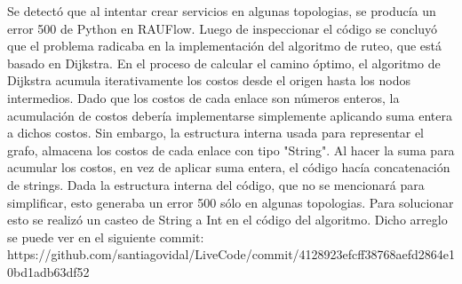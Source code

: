 Se detectó que al intentar crear servicios en algunas topologias, se producía un error 500 de Python en RAUFlow. Luego de inspeccionar el código se concluyó que el problema radicaba en la implementación del algoritmo de ruteo, que está basado en Dijkstra. En el proceso de calcular el camino óptimo, el algoritmo de Dijkstra acumula iterativamente los costos desde el origen hasta los nodos intermedios. Dado que los costos de cada enlace son números enteros, la acumulación de costos debería implementarse simplemente aplicando suma entera a dichos costos. Sin embargo, la estructura interna usada para representar el grafo, almacena los costos de cada enlace con tipo "String". Al hacer la suma para acumular los costos, en vez de aplicar suma entera, el código hacía concatenación de strings. Dada la estructura interna del código, que no se mencionará para simplificar, esto generaba un error 500 sólo en algunas topologias. Para solucionar esto se realizó un casteo de String a Int en el código del algoritmo. Dicho arreglo se puede ver en el siguiente commit: https://github.com/santiagovidal/LiveCode/commit/4128923efcff38768aefd2864e10bd1adb63df52 \\ \\

